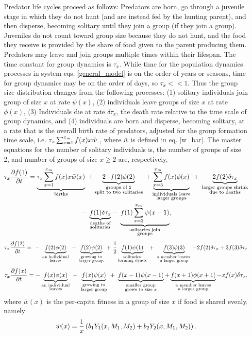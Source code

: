 Predator life cycles proceed as follows: Predators are born, go through a juvenile stage in which they do not hunt (and are instead fed by the hunting parent), and then disperse, becoming solitary until they join a group (if they join a group). Juveniles do not count toward group size because they do not hunt, and the food they receive is provided by the share of food given to the parent producing them. Predators may leave and join groups multiple times within their lifespan. The time constant for group dynamics is $\tau_x$. While time for the population dynamics processes in system eqs. \ref{general_model} is on the order of years or seasons, time for group dynamics may be on the order of days, so $\tau_x << 1$. Thus the group size distribution changes from the following processes: (1) solitary individuals join group of size $x$ at rate $\psi(x)$, (2) individuals leave groups of size $x$ at rate $\phi(x)$, (3) Individuals die at rate $\delta \tau_x$, the death rate relative to the time scale of group dynamics, and (4) individuals are born and disperse, becoming solitary, at a rate that is the overall birth rate of predators, adjusted for the group formation time scale, i.e. $\tau_x \sum_{x=1}^{x_{m}} f(x) x\bar{w}$ , where $\bar{w}$ is defined in eq. \ref{w_bar}. The master equations for the number of solitary individuals is, the number of groups of size 2, and number of groups of size $x \geq 2$ are, respectively,
\begin{multline} \label{df_of_1}
\tau_x \pdv{f(1)}{t} = \underbrace{\tau_x \sum_{x=1}^{x_{m}} f(x) x\bar{w}(x)}_{\substack{\text{births} \\ \text{} } }\ + \underbrace{2 \cdot f(2) \phi(2)}_{\substack{\text{groups of 2} \\ \text{split to two solitaries} } } \ +  \underbrace{\sum_{x=3}^{x_{m}} f(x) \phi(x)}_{\substack{\text{individuals leave} \\ \text{larger groups} } }\  + \  \underbrace{2 f(2) \delta \tau_x }_{\substack{\text{larger groups shrink} \\ \text{due to deaths} } } \\
-\  \underbrace{f(1) \delta \tau_x}_{\substack{\text{deaths of} \\ \text{solitaries} } } -\  \underbrace{ f(1) \sum_{x=2}^{x_{m}} \psi(x-1)}_{\substack{\text{solitaries join} \\ \text{groups} } },
\end{multline}
\begin{equation} \label{df_dt_2}
\tau_x \pdv{f(2)}{t} = \ -\  \underbracetwo{f(2) \phi(2)}{an individual}{leaves} 
\ - \ \underbracetwo{f(2) \psi(2) }{growing to}{larger group} \ +\  \frac{1}{2} \underbracetwo{f(1) \psi(1)}{solitaries}{forming dyads}\ +\ \underbracetwo{f(3)\phi(3)}{a member leaves }{a larger group} - 2 f(2) \delta \tau_x + 3 f(3) \delta \tau_x
\end{equation}
\begin{equation} \label{df_dt}
\tau_x \pdv{f(x)}{t} = -\underbrace{  f(x) \phi(x) }_{\substack{\text{an individual} \\ \text{leaves} } } \ - \ \underbrace{f(x) \psi(x) }_{\substack{\text{growing to} \\ \text{larger group} } } \ +\ \underbrace{f(x-1)\psi(x-1)}_{\substack{\text{smaller group} \\ \text{grows to size $x$} } } + \underbrace{f(x+1)\phi(x+1)}_{\substack{\text{a member leaves} \\ \text{a larger group} } } - x f(x) \delta \tau_x,
\end{equation}
where $\bar{w}(x)$ is the per-capita fitness in a group of size $x$ if food is shared evenly, namely
\begin{equation}\label{w_bar}
\bar{w}(x) = \frac{1}{x} \left( b_1Y_1(x,M_1,M_2) + b_2Y_2(x,M_1,M_2) \right).
\end{equation}

